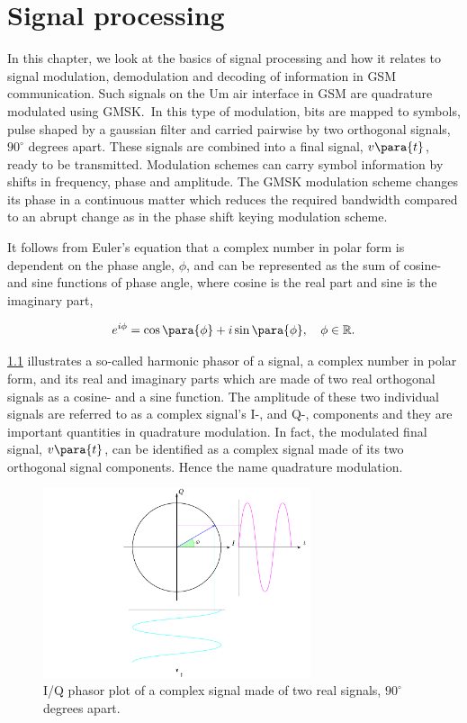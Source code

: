 \chapter{Signal processing}
In this chapter, we look at the basics of signal processing and how it
relates to signal modulation, demodulation and decoding of information
in \gls{GSM} communication. Such signals on the Um air interface in
GSM are quadrature modulated using \gls{GMSK}.\ In this type of
modulation, bits are mapped to symbols, pulse shaped by a gaussian
filter and carried pairwise by two orthogonal signals, $90^{\circ}$
degrees apart. These signals are combined into a final signal,
$v \para{t}$, ready to be transmitted. Modulation schemes can carry
symbol information by shifts in frequency, phase and amplitude. The
\gls{GMSK} modulation scheme changes its phase in a continuous matter which
reduces the required bandwidth compared to an abrupt change as in the
phase shift keying modulation scheme.

It follows from Euler's equation that a complex number in polar form
is dependent on the phase angle, $\phi$, and can be represented as the
sum of cosine- and sine functions of phase angle, where cosine is the
real part and sine is the imaginary part,

\begin{equation}
  e^{i \phi} = \cos \para{\phi} + i \sin \para{\phi}, \quad \phi \in \mathbb{R}.
\end{equation}

\cref{fig:phasor_diagram} illustrates a so-called harmonic phasor of a
signal, a complex number in polar form, and its real and imaginary
parts which are made of two real orthogonal signals as a cosine- and a
sine function. The amplitude of these two individual signals are
referred to as a complex signal's \gls{I}-, and \gls{Q}-, components
and they are important quantities in quadrature modulation. In fact,
the modulated final signal, $v \para{t}$, can be identified as a
complex signal made of its two orthogonal signal components. Hence the
name quadrature modulation.

\begin{figure}
  \centering
  \includegraphics[width=0.7\textwidth]{figures/phasor_diagram}
  \caption{I/Q phasor plot of a complex signal made of two
    real signals, $90^{\circ}$ degrees apart.}
  \label{fig:phasor_diagram}
\end{figure}

